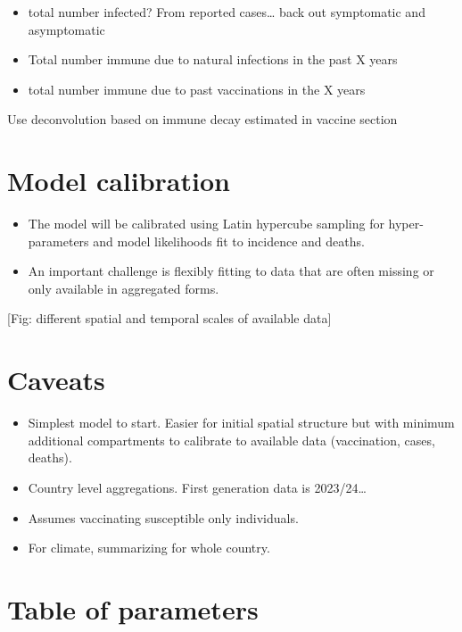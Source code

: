 \documentclass[
]{book}
\providecommand{\tightlist}{%
  \setlength{\itemsep}{0pt}\setlength{\parskip}{0pt}}
\begin{document}
\begin{itemize}
\item
  total number infected? From reported cases\ldots{} back out symptomatic and asymptomatic
\item
  Total number immune due to natural infections in the past X years
\item
  total number immune due to past vaccinations in the X years
\end{itemize}

Use deconvolution based on immune decay estimated in vaccine section

\section{Model calibration}\label{model-calibration}

\begin{itemize}
\item
  The model will be calibrated using Latin hypercube sampling for hyper-parameters and model likelihoods fit to incidence and deaths.
\item
  An important challenge is flexibly fitting to data that are often missing or only available in aggregated forms.
\end{itemize}

{[}Fig: different spatial and temporal scales of available data{]}

\section{Caveats}\label{caveats}

\begin{itemize}
\tightlist
\item
  Simplest model to start. Easier for initial spatial structure but with minimum additional compartments to calibrate to available data (vaccination, cases, deaths).
\item
  Country level aggregations. First generation data is 2023/24\ldots{}
\item
  Assumes vaccinating susceptible only individuals.
\item
  For climate, summarizing for whole country.
\end{itemize}

\section{Table of parameters}\label{table-of-parameters}
\end{document}
